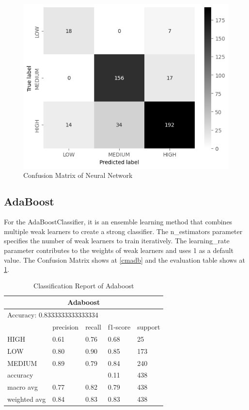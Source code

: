 \begin{figure}[H]
    \includegraphics[scale=0.7]{imgs/nn_cm.png}
    \centering
    \caption{Confusion Matrix of Neural Network}
    \label{cmNN}
\end{figure}

\subsection{AdaBoost}

For the AdaBoostClassifier, it is an ensemble learning method that combines multiple weak learners to create a strong classifier. The n\_estimators parameter specifies the number of weak learners to train iteratively. The learning\_rate parameter contributes to the weights of weak learners and uses 1 as a default value.
The Confusion Matrix shows at \ref*{cmadb} and the evaluation table shows at \ref*{tableADB}.

\begin{table}[H]\centering
    \begin{tabular}{@{}lllll@{}}
    \toprule
    \multicolumn{5}{c}{Adaboost}                 \\ \midrule
    \multicolumn{5}{l}{Accuracy:  0.8333333333333334}       \\\midrule
                 & precision & recall & f1-score & support \\
    HIGH         & 0.61      & 0.76   & 0.68     & 25      \\ 
    LOW          & 0.80      & 0.90   & 0.85     & 173     \\
    MEDIUM       & 0.89      & 0.79   & 0.84     & 240     \\
    accuracy     &           &        & 0.11     & 438     \\
    macro avg    & 0.77      & 0.82   & 0.79     & 438     \\
    weighted avg & 0.84      & 0.83   & 0.83     & 438     \\ \bottomrule
    \end{tabular}
    \caption{Classification Report of Adaboost}
    \label{tableADB}
    \end{table}

